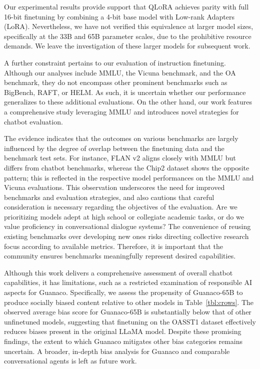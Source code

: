 Our experimental results provide support that \textsc{QLoRA} achieves parity with full 16-bit finetuning by combining a 4-bit base model with Low-rank Adapters (LoRA). Nevertheless, we have not verified this equivalence at larger model sizes, specifically at the 33B and 65B parameter scales, due to the prohibitive resource demands. We leave the investigation of these larger models for subsequent work.

A further constraint pertains to our evaluation of instruction finetuning. Although our analyses include MMLU, the Vicuna benchmark, and the OA benchmark, they do not encompass other prominent benchmarks such as BigBench, RAFT, or HELM. As such, it is uncertain whether our performance generalizes to these additional evaluations. On the other hand, our work features a comprehensive study leveraging MMLU and introduces novel strategies for chatbot evaluation.

The evidence indicates that the outcomes on various benchmarks are largely influenced by the degree of overlap between the finetuning data and the benchmark test sets. For instance, FLAN v2 aligns closely with MMLU but differs from chatbot benchmarks, whereas the Chip2 dataset shows the opposite pattern; this is reflected in the respective model performances on the MMLU and Vicuna evaluations. This observation underscores the need for improved benchmarks and evaluation strategies, and also cautions that careful consideration is necessary regarding the objectives of the evaluation. Are we prioritizing models adept at high school or collegiate academic tasks, or do we value proficiency in conversational dialogue systems? The convenience of reusing existing benchmarks over developing new ones risks directing collective research focus according to available metrics. Therefore, it is important that the community ensures benchmarks meaningfully represent desired capabilities.

Although this work delivers a comprehensive assessment of overall chatbot capabilities, it has limitations, such as a restricted examination of responsible AI aspects for {Guanaco}. Specifically, we assess the propensity of {Guanaco}-65B to produce socially biased content relative to other models in Table~\ref{tbl:crows}. The observed average bias score for {Guanaco}-65B is substantially below that of other unfinetuned models, suggesting that finetuning on the OASST1 dataset effectively reduces biases present in the original LLaMA model. Despite these promising findings, the extent to which {Guanaco} mitigates other bias categories remains uncertain. A broader, in-depth bias analysis for {Guanaco} and comparable conversational agents is left as future work.

